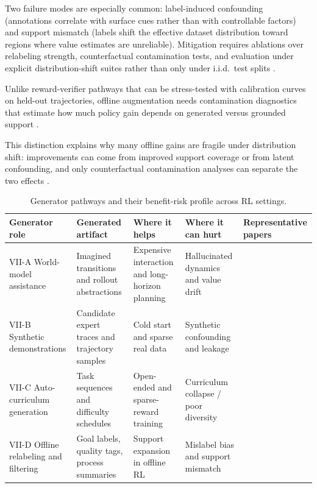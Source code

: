 ﻿\documentclass[conference]{IEEEtran}
\begin{document}
Two failure modes are especially common: label-induced confounding (annotations correlate with surface cues rather than with controllable factors) and support mismatch (labels shift the effective dataset distribution toward regions where value estimates are unreliable). Mitigation requires ablations over relabeling strength, counterfactual contamination tests, and evaluation under explicit distribution-shift suites rather than only under i.i.d.\ test splits \cite{arxiv_p_2505_18098,arxiv_p_2601_14228,arxiv_p_2602_03073}.

Unlike reward-verifier pathways that can be stress-tested with calibration curves on held-out trajectories, offline augmentation needs contamination diagnostics that estimate how much policy gain depends on generated versus grounded support \cite{arxiv_p_2602_02137,doi_p_10_14778_3685800_3685913,arxiv_p_2505_18098}.

This distinction explains why many offline gains are fragile under distribution shift: improvements can come from improved support coverage or from latent confounding, and only counterfactual contamination analyses can separate the two effects \cite{arxiv_p_2310_20587,arxiv_p_2601_03205,arxiv_p_2601_14228,arxiv_p_2602_03073}.

\begin{table}[t]
\centering
\footnotesize
\setlength{\tabcolsep}{4pt}
\begin{tabularx}{\textwidth}{P{2.3cm}P{2.6cm}P{2.1cm}P{2.1cm}Y}
\toprule
\textbf{Generator role} & \textbf{Generated artifact} & \textbf{Where it helps} & \textbf{Where it can hurt} & \textbf{Representative papers}\\
\midrule
VII-A World-model assistance & Imagined transitions and rollout abstractions & Expensive interaction and long-horizon planning & Hallucinated dynamics and value drift & \cite{arxiv_p_2301_12050,arxiv_p_2602_02454,arxiv_p_2602_11075}\\
VII-B Synthetic demonstrations & Candidate expert traces and trajectory samples & Cold start and sparse real data & Synthetic confounding and leakage & \cite{arxiv_p_2310_20587,arxiv_p_2505_18098,arxiv_p_2601_08107}\\
VII-C Auto-curriculum generation & Task sequences and difficulty schedules & Open-ended and sparse-reward training & Curriculum collapse / poor diversity & \cite{arxiv_p_2512_16848,arxiv_p_2601_18225,arxiv_p_2601_20802}\\
VII-D Offline relabeling and filtering & Goal labels, quality tags, process summaries & Support expansion in offline RL & Mislabel bias and support mismatch & \cite{arxiv_p_2602_02137,arxiv_p_2602_03305,doi_p_10_14778_3685800_3685913}\\
\bottomrule
\end{tabularx}
\caption{Generator pathways and their benefit-risk profile across RL settings.}
\label{tab:t4_generator}
\end{table}
\end{document}
